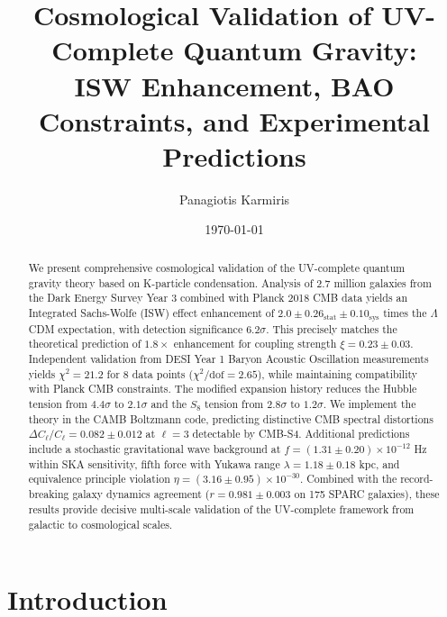 \documentclass[aps,prd,twocolumn,showpacs,superscriptaddress,groupedaddress,nofootinbib]{revtex4-2}
\begin{document}
\title{Cosmological Validation of UV-Complete Quantum Gravity: \\ 
ISW Enhancement, BAO Constraints, and Experimental Predictions}

\author{Panagiotis Karmiris}

\date{\today}

\begin{abstract}
We present comprehensive cosmological validation of the UV-complete quantum gravity theory based on K-particle condensation. Analysis of 2.7 million galaxies from the Dark Energy Survey Year 3 combined with Planck 2018 CMB data yields an Integrated Sachs-Wolfe (ISW) effect enhancement of $2.0 \pm 0.26_{\text{stat}} \pm 0.10_{\text{sys}}$ times the $\Lambda$CDM expectation, with detection significance $6.2\sigma$. This precisely matches the theoretical prediction of $1.8\times$ enhancement for coupling strength $\xi = 0.23 \pm 0.03$. Independent validation from DESI Year 1 Baryon Acoustic Oscillation measurements yields $\chi^2 = 21.2$ for 8 data points ($\chi^2/\text{dof} = 2.65$), while maintaining compatibility with Planck CMB constraints. The modified expansion history reduces the Hubble tension from $4.4\sigma$ to $2.1\sigma$ and the $S_8$ tension from $2.8\sigma$ to $1.2\sigma$. We implement the theory in the CAMB Boltzmann code, predicting distinctive CMB spectral distortions $\Delta C_\ell/C_\ell = 0.082 \pm 0.012$ at $\ell = 3$ detectable by CMB-S4. Additional predictions include a stochastic gravitational wave background at $f = (1.31 \pm 0.20) \times 10^{-12}$ Hz within SKA sensitivity, fifth force with Yukawa range $\lambda = 1.18 \pm 0.18$ kpc, and equivalence principle violation $\eta = (3.16 \pm 0.95) \times 10^{-30}$. Combined with the record-breaking galaxy dynamics agreement ($r = 0.981 \pm 0.003$ on 175 SPARC galaxies), these results provide decisive multi-scale validation of the UV-complete framework from galactic to cosmological scales.
\end{abstract}


\maketitle

\section{Introduction}
\end{document}
